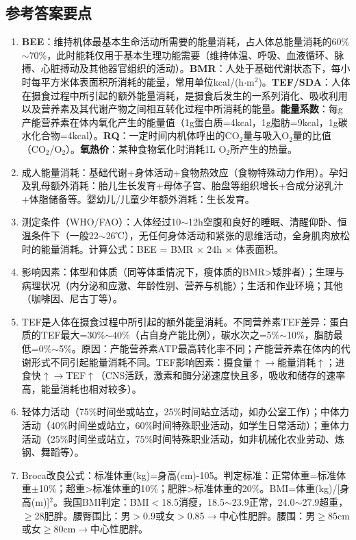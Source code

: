 {\subsection*{参考答案要点}
\begin{enumerate}[leftmargin=*, itemsep=5pt]
    \item \textbf{BEE}：维持机体最基本生命活动所需要的能量消耗，占人体总能量消耗的60\%$\sim$70\%，此时能耗仅用于基本生理功能需要（维持体温、呼吸、血液循环、脉搏、心脏搏动及其他器官组织的活动）。\textbf{BMR}：人处于基础代谢状态下，每小时每平方米体表面积所消耗的能量，常用单位kcal/(h$\cdot$m$^2$)。\textbf{TEF/SDA}：人体在摄食过程中所引起的额外能量消耗，是摄食后发生的一系列消化、吸收利用以及营养素及其代谢产物之间相互转化过程中所消耗的能量。\textbf{能量系数}：每g产能营养素在体内氧化产生的能量值（1g蛋白质=4kcal，1g脂肪=9kcal，1g碳水化合物=4kcal）。\textbf{RQ}：一定时间内机体呼出的CO$_2$量与吸入O$_2$量的比值（CO$_2$/O$_2$）。\textbf{氧热价}：某种食物氧化时消耗1L O$_2$所产生的热量。
    \item 成人能量消耗：基础代谢+身体活动+食物热效应（食物特殊动力作用）。孕妇及乳母额外消耗：胎儿生长发育+母体子宫、胎盘等组织增长+合成分泌乳汁+体脂储备等。婴幼儿/儿童少年额外消耗：生长发育。
    \item 测定条件（WHO/FAO）：人体经过10$\sim$12h空腹和良好的睡眠、清醒仰卧、恒温条件下（一般22$\sim$26℃），无任何身体活动和紧张的思维活动，全身肌肉放松时的能量消耗。计算公式：BEE = BMR $\times$ 24h $\times$ 体表面积。
    \item 影响因素：体型和体质（同等体重情况下，瘦体质的BMR>矮胖者）；生理与病理状况（内分泌和应激、年龄性别、营养与机能）；生活和作业环境；其他（咖啡因、尼古丁等）。
    \item TEF是人体在摄食过程中所引起的额外能量消耗。不同营养素TEF差异：蛋白质的TEF最大=30\%$\sim$40\%（占自身产能比例），碳水次之=5\%$\sim$10\%，脂肪最低=0\%$\sim$5\%。原因：产能营养素ATP最高转化率不同；产能营养素在体内的代谢形式不同引起能量消耗不同。TEF影响因素：摄食量$\uparrow$$\rightarrow$能量消耗$\uparrow$；进食快$\uparrow$$\rightarrow$TEF$\uparrow$（CNS活跃，激素和酶分泌速度快且多，吸收和储存的速率高，能量消耗也相对较多）。
    \item 轻体力活动（75\%时间坐或站立，25\%时间站立活动，如办公室工作）；中体力活动（40\%时间坐或站立，60\%时间特殊职业活动，如学生日常活动）；重体力活动（25\%时间坐或站立，75\%时间特殊职业活动，如非机械化农业劳动、炼钢、舞蹈等）。
    \item Broca改良公式：标准体重(kg)=身高(cm)-105。判定标准：正常体重=标准体重$\pm$10\%；超重>标准体重的10\%；肥胖>标准体重的20\%。BMI=体重(kg)/[身高(m)]$^2$。我国BMI判定：BMI$<$18.5消瘦，18.5$\sim$23.9正常，24.0$\sim$27.9超重，$\ge$28肥胖。腰臀围比：男$>$0.9或女$>$0.85$\rightarrow$中心性肥胖。腰围：男$\ge$85cm或女$\ge$80cm$\rightarrow$中心性肥胖。

\end{enumerate}}
